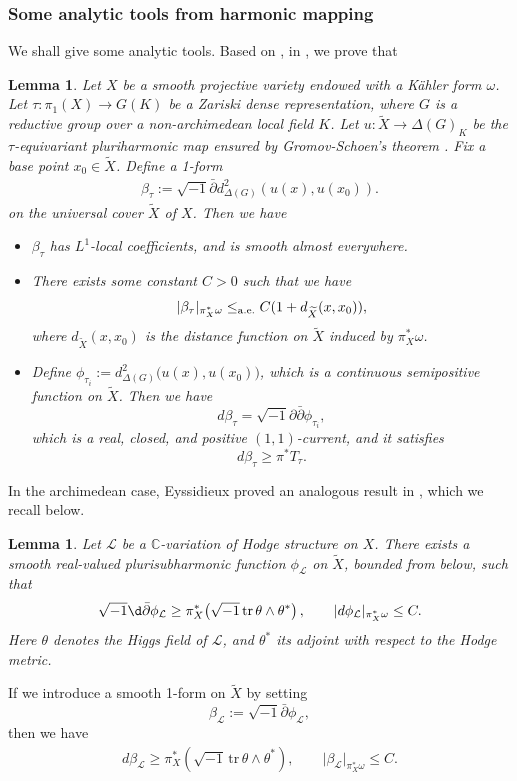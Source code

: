 \documentclass[english]{amsproc}
\theoremstyle{plain}
\newtheorem{lem}[thm]{Lemma}
\theoremstyle{definition}
\theoremstyle{remark}
\theoremstyle{plain}
\numberwithin{equation}{thm} %
\newcommand{\cL}{\mathcal L}
\def\db{\bar{\partial}}
\def\sn{\sqrt{-1}}
\begin{document}
\subsubsection{Some analytic tools from harmonic mapping} 
We shall give some analytic tools.  Based on \cite[Proposition 4.15]{DM24}, in \cite[\S 3]{DW24b}, we prove  that  
\begin{lem}\label{lem:potential}
	Let $X$ be a smooth projective variety endowed with a    K\"ahler form $\omega$.  Let $\tau:\pi_1(X)\to G(K)$ be  a Zariski dense representation, where $G$ is a reductive group over   a non-archimedean local field $K$. Let $u:\widetilde{X}\to \Delta(G)_K$ be the $\tau$-equivariant pluriharmonic map ensured by Gromov-Schoen's theorem \cite{GS92}. Fix a base point $x_0\in \widetilde{X}$. Define a 1-form 
	\begin{align}\label{eq:1-form}
		\beta_\tau:=\sn\db d_{\Delta(G)}^2(u(x),u(x_0)). 
	\end{align} 
	 on the universal cover $\widetilde{X}$ of $X$.  	Then we have
	\begin{itemize}
		\item  $\beta_\tau$ has $L^1$-local coefficients, and is smooth almost everywhere.
		\item There exists some constant $C>0$ such that we have \[|\beta_\tau|_{\pi_X^*\omega}\leq_{\rm a.e.} C(1+d_{\widetilde{X}}(x,x_0)),\] where $d_{\widetilde{X}}(x,x_0)$ is the distance function on $\widetilde{X}$ induced by $\pi_X^*\omega$. 
	\item Define $\phi_{\tau_i} := d_{\Delta(G)}^{2}\bigl(u(x), u(x_0)\bigr)$, which is a continuous semipositive function on $\widetilde{X}$. Then we have
	\[
	d\beta_\tau = \sn \partial\bar{\partial} \phi_{\tau_i},
	\]
	which is a real, closed, and positive $(1,1)$-current, and it satisfies
	\[
	d\beta_\tau \geq \pi^* T_\tau .
	\] 
	\end{itemize}  
\end{lem}
In the archimedean case, Eyssidieux proved an analogous result in 
\cite[Proposition~4.5.1]{Eys00}, which we recall below.
\begin{lem}\label{lem:potential3}
Let \(\mathcal{L}\) be a \(\mathbb{C}\)-variation of Hodge structure on \(X\).
There exists a smooth  real-valued   plurisubharmonic function 
\(\phi_\cL\) on \(\widetilde{X}\), bounded from below, such that 
$$
\sn \d\db \phi_\cL\ge \pi_X^{*}\!\left(\sqrt{-1}\,\mathrm{tr}\,\theta \wedge \theta^{*}\right), \qquad 
\lvert d\phi_\cL\rvert_{\pi_X^{*}\omega} \le C .
$$
Here \(\theta\) denotes the Higgs field of \(\mathcal{L}\), and \(\theta^{*}\) its adjoint with 
respect to the Hodge metric.  
 \end{lem} 
 If we  introduce a  smooth 1-form  on $\widetilde{X}$ by setting 
 $$
 \beta_\cL:=\sn \db \phi_\cL, 
 $$
 then we have  
\begin{align}\label{lem:potential2}
	  d\beta_{\mathcal{L}} \ge \pi_X^{*}\!\left(\sqrt{-1}\,\mathrm{tr}\,\theta \wedge \theta^{*}\right),
	 \qquad 
	 \lvert \beta_{\mathcal{L}} \rvert_{\pi_X^{*}\omega} \le C.
\end{align} 
 
\end{document}
